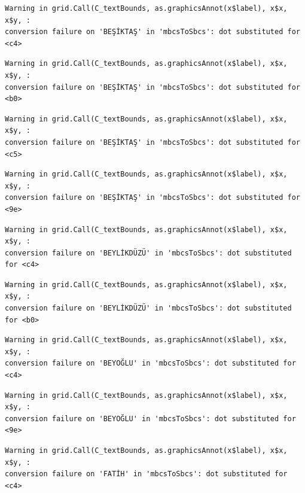 \documentclass[
  11pt,
  a4paper,
  DIV=11,
  numbers=noendperiod]{scrartcl}
\begin{document}
\begin{verbatim}
Warning in grid.Call(C_textBounds, as.graphicsAnnot(x$label), x$x, x$y, :
conversion failure on 'BEŞİKTAŞ' in 'mbcsToSbcs': dot substituted for <c4>
\end{verbatim}

\begin{verbatim}
Warning in grid.Call(C_textBounds, as.graphicsAnnot(x$label), x$x, x$y, :
conversion failure on 'BEŞİKTAŞ' in 'mbcsToSbcs': dot substituted for <b0>
\end{verbatim}

\begin{verbatim}
Warning in grid.Call(C_textBounds, as.graphicsAnnot(x$label), x$x, x$y, :
conversion failure on 'BEŞİKTAŞ' in 'mbcsToSbcs': dot substituted for <c5>
\end{verbatim}

\begin{verbatim}
Warning in grid.Call(C_textBounds, as.graphicsAnnot(x$label), x$x, x$y, :
conversion failure on 'BEŞİKTAŞ' in 'mbcsToSbcs': dot substituted for <9e>
\end{verbatim}

\begin{verbatim}
Warning in grid.Call(C_textBounds, as.graphicsAnnot(x$label), x$x, x$y, :
conversion failure on 'BEYLİKDÜZÜ' in 'mbcsToSbcs': dot substituted for <c4>
\end{verbatim}

\begin{verbatim}
Warning in grid.Call(C_textBounds, as.graphicsAnnot(x$label), x$x, x$y, :
conversion failure on 'BEYLİKDÜZÜ' in 'mbcsToSbcs': dot substituted for <b0>
\end{verbatim}

\begin{verbatim}
Warning in grid.Call(C_textBounds, as.graphicsAnnot(x$label), x$x, x$y, :
conversion failure on 'BEYOĞLU' in 'mbcsToSbcs': dot substituted for <c4>
\end{verbatim}

\begin{verbatim}
Warning in grid.Call(C_textBounds, as.graphicsAnnot(x$label), x$x, x$y, :
conversion failure on 'BEYOĞLU' in 'mbcsToSbcs': dot substituted for <9e>
\end{verbatim}

\begin{verbatim}
Warning in grid.Call(C_textBounds, as.graphicsAnnot(x$label), x$x, x$y, :
conversion failure on 'FATİH' in 'mbcsToSbcs': dot substituted for <c4>
\end{verbatim}
\end{document}

